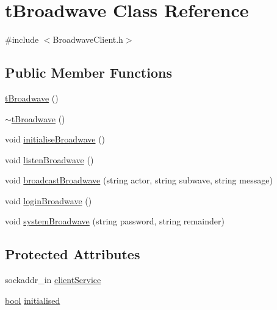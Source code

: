 \hypertarget{classtBroadwave}{\section{t\-Broadwave Class Reference}
\label{classtBroadwave}
}


{\ttfamily \#include $<$Broadwave\-Client.\-h$>$}

\subsection*{Public Member Functions}
\begin{DoxyCompactItemize}
\item 
\hyperlink{classtBroadwave_a49e6459acc422e1e50ea686dc57d2908}{t\-Broadwave} ()
\item 
\hyperlink{classtBroadwave_a5fb9bf57c5957e26c961a5acc00d732a}{$\sim$t\-Broadwave} ()
\item 
void \hyperlink{classtBroadwave_a66ca08d576ca703db094ccd501ba1ef1}{initialise\-Broadwave} ()
\item 
void \hyperlink{classtBroadwave_a74ec4ce019b8c3a76b38322628944425}{listen\-Broadwave} ()
\item 
void \hyperlink{classtBroadwave_a0c5a7502622dbc6e5250787c60994be6}{broadcast\-Broadwave} (string actor, string subwave, string message)
\item 
void \hyperlink{classtBroadwave_ab8683c7cb9d5f0dbc2c26e3f4280a410}{login\-Broadwave} ()
\item 
void \hyperlink{classtBroadwave_a9440718c9bc24ec9ca48c4cec153ee79}{system\-Broadwave} (string password, string remainder)
\end{DoxyCompactItemize}
\subsection*{Protected Attributes}
\begin{DoxyCompactItemize}
\item 
sockaddr\-\_\-in \hyperlink{classtBroadwave_adff4bca86536a98a70666d4a6151f0c0}{client\-Service}
\item 
\hyperlink{structs_8h_ad5c9d4ba3dc37783a528b0925dc981a0}{bool} \hyperlink{classtBroadwave_a870c289fd02820e7398ee604675c9783}{initialised}
\end{DoxyCompactItemize}



